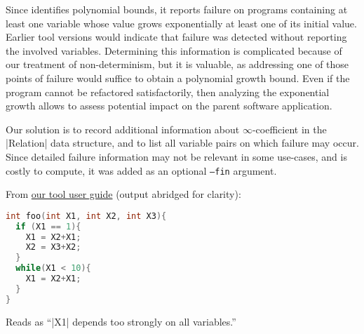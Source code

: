 \documentclass[runningheads]{llncs}
\begin{document}
Since \pymwp identifies polynomial bounds, it reports failure on programs containing at least one variable whose value grows exponentially \wrt at least one of its initial value.
Earlier tool versions would indicate that failure was detected without reporting the involved variables.
Determining this information is complicated because of our treatment of non-determinism, but it is valuable, as addressing one of those points of failure would suffice to obtain a polynomial growth bound.
Even if the program cannot be refactored satisfactorily, then analyzing the exponential growth allows to assess potential impact on the parent software application.

Our solution is to record additional information about $\infty$-coefficient in the \pr|Relation| data structure, and to list all variable pairs on which failure may occur.
Since detailed failure information may not be relevant in some use-cases, and is costly to compute, it was added as an optional \texttt{--fin} argument.

\begin{example}
From \href{https://statycc.github.io/.github/pymwp/\#inf-prog}{our tool user guide} (output abridged for clarity): 

\noindent
\begin{minipage}[b][][b]{0.65\textwidth}
\begin{lstlisting}[language=C]
int foo(int X1, int X2, int X3){
  if (X1 == 1){
    X1 = X2+X1;
    X2 = X3+X2;
  }
  while(X1 < 10){
    X1 = X2+X1;
  }
}
\end{lstlisting}
\end{minipage}
\hspace{-11em}
\begin{minipage}[b][][t]{0.65\textwidth}
Reads as \enquote{\prc|X1| depends too strongly on all variables.}
\end{minipage}
\end{example}
\end{document}
